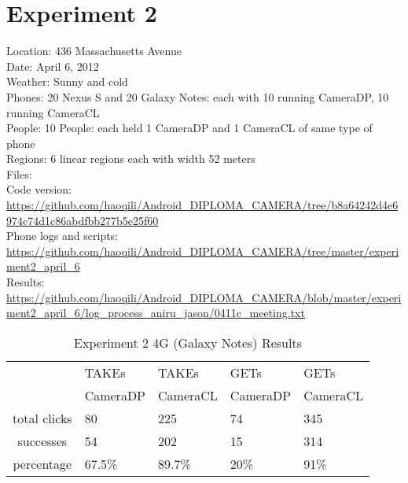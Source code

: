 \section{Experiment 2}

Location: 436 Massachusetts Avenue\\
Date: April 6, 2012\\
Weather: Sunny and cold\\
Phones: 20 Nexus S and 20 Galaxy Notes: each with 10 running CameraDP, 10 running CameraCL\\
People: 10 People: each held 1 CameraDP and 1 CameraCL of same type of phone\\
Regions: 6 linear regions each with width 52 meters\\
Files:\\
Code version: {\url{https://github.com/haoqili/Android_DIPLOMA_CAMERA/tree/b8a64242d4e6974c74d1c86abdfbb277b5e25f60}}\\
Phone logs and scripts: {\url{https://github.com/haoqili/Android_DIPLOMA_CAMERA/tree/master/experiment2_april_6}}\\ 
Results: {\url{https://github.com/haoqili/Android_DIPLOMA_CAMERA/blob/master/experiment2_april_6/log_process_aniru_jason/0411c_meeting.txt}}\\

\begin{table}[htb]
\begin{scriptsize} 
\caption{Experiment 2 4G (Galaxy Notes) Results} 
\label{table:exp-2-4g-results}
 \begin{center}
 \begin{tabular}{| c | p{1.5cm} | p{1.5cm} | p{1.5cm} | p{1.4cm} |}
  \hline
  & TAKEs & TAKEs & GETs & GETs \\
  & CameraDP & CameraCL & CameraDP & CameraCL \\
  \hline
  total clicks & 80 & 225 & 74 & 345 \\
  \hline
  successes & 54 & 202 & 15 & 314 \\
  \hline
  percentage & 67.5\% & 89.7\% & 20\% & 91\% \\
  \hline
  \end{tabular}
  \end{center}
\end{scriptsize}
\end{table}

